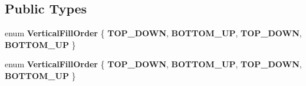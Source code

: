 \subsection*{Public Types}
\begin{DoxyCompactItemize}
\item 
\mbox{\label{classTableView_ac3f6f6313847def1d5e5019c47aaf263}} 
enum {\bfseries Vertical\+Fill\+Order} \{ {\bfseries T\+O\+P\+\_\+\+D\+O\+WN}, 
{\bfseries B\+O\+T\+T\+O\+M\+\_\+\+UP}, 
{\bfseries T\+O\+P\+\_\+\+D\+O\+WN}, 
{\bfseries B\+O\+T\+T\+O\+M\+\_\+\+UP}
 \}
\item 
\mbox{\label{classTableView_ac3f6f6313847def1d5e5019c47aaf263}} 
enum {\bfseries Vertical\+Fill\+Order} \{ {\bfseries T\+O\+P\+\_\+\+D\+O\+WN}, 
{\bfseries B\+O\+T\+T\+O\+M\+\_\+\+UP}, 
{\bfseries T\+O\+P\+\_\+\+D\+O\+WN}, 
{\bfseries B\+O\+T\+T\+O\+M\+\_\+\+UP}
 \}
\end{DoxyCompactItemize}
